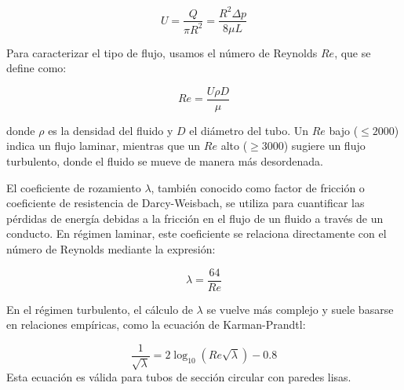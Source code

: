 	\vspace{\baselineskip}
	\begin{equation}
		U = \frac{Q}{\pi R^2} = \frac{R^2 \Delta p}{8 \mu L}
		\label{eq:velocidad_promedio}
	\end{equation}
	
	\vspace{\baselineskip}
	
	Para caracterizar el tipo de flujo, usamos el número de Reynolds \( Re \), que se define como:
	
	\vspace{\baselineskip}
	
	\begin{equation}
		Re = \frac{U \rho D}{\mu}
		\label{eq:reynolds}
	\end{equation}
	
	\vspace{\baselineskip}
	
	donde \( \rho \) es la densidad del fluido y \( D \) el diámetro del tubo. Un \( Re \) bajo (\( \leq 2000 \)) indica un flujo laminar, mientras que un \( Re \) alto (\( \geq 3000 \)) sugiere un flujo turbulento, donde el fluido se mueve de manera más desordenada.
	
	\vspace{\baselineskip}
	
	El coeficiente de rozamiento \( \lambda \), también conocido como factor de fricción o coeficiente de resistencia de Darcy-Weisbach, se utiliza para cuantificar las pérdidas de energía debidas a la fricción en el flujo de un fluido a través de un conducto. En régimen laminar, este coeficiente se relaciona directamente con el número de Reynolds mediante la expresión:
	
	\begin{equation}
		\lambda = \frac{64}{Re}
		\label{eq:laminar_friction}
	\end{equation}
	
	En el régimen turbulento, el cálculo de \( \lambda \) se vuelve más complejo y suele basarse en relaciones empíricas, como la ecuación de Karman-Prandtl:
	
	\begin{equation}
		\frac{1}{\sqrt{\lambda}} = 2 \log_{10}(Re \sqrt{\lambda}) - 0.8
		\label{eq:karman_prandtl}
	\end{equation}
	\vspace{\baselineskip}
	Esta ecuación es válida para tubos de sección circular con paredes lisas.
	
	\vspace{\baselineskip}
	
